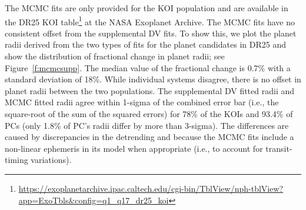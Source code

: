 The MCMC fits are only provided for the KOI population and are available in the DR25 KOI table\footnote{\url{https://exoplanetarchive.ipac.caltech.edu/cgi-bin/TblView/nph-tblView?app=ExoTbls\&config=q1\_q17\_dr25\_koi}} at the NASA Exoplanet Archive. The MCMC fits have no consistent offset from the supplemental DV fits.  To show this, we plot the planet radii derived from the two types of fits for the planet candidates in DR25 and show the distribution of fractional change in planet radii; see Figure~\ref{f:mcmcsupp}. The median value of the fractional change is 0.7\% with a standard deviation of 18\%. While individual systems disagree, there is no offset in planet radii between the two populations. The supplemental DV fitted radii and MCMC fitted radii agree within 1-sigma of the combined error bar (i.e., the square-root of the sum of the squared errors) for 78\% of the KOIs and 93.4\% of PCs (only 1.8\% of PC's radii differ by more than 3-sigma).  The differences are caused by discrepancies in the detrending and because the MCMC fits include a non-linear ephemeris in its model when appropriate (i.e., to account for transit-timing variations).

